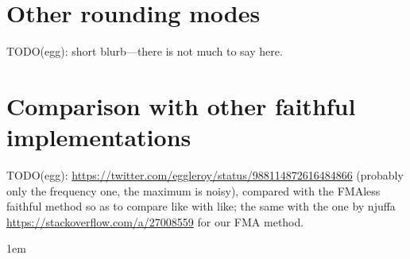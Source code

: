 ﻿\documentclass[10pt, a4paper, twoside]{basestyle}
\begin{document}
\section{Other rounding modes}
\label{OtherRoundingModes}

TODO(egg): short blurb---there is not much to say here.

\section{Comparison with other faithful implementations}

TODO(egg): \url{https://twitter.com/eggleroy/status/988114872616484866} (probably only the frequency one,
the maximum is noisy), compared with the FMAless faithful method so as to compare like with like; the same
with the one by njuffa \url{https://stackoverflow.com/a/27008559} for our FMA method.

\emergencystretch 1em
\end{document}
